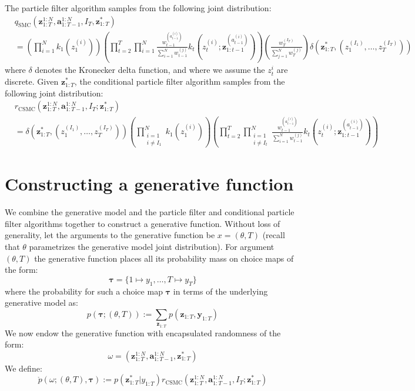 \documentclass[11pt]{article}
\newcommand{\z}{\mathbf{z}}
\newcommand{\abold}{\mathbf{a}}
\newcommand{\y}{\mathbf{y}}
\newcommand\tdict[0]{\boldsymbol{\tau}}
\begin{document}
The particle filter algorithm samples from the following joint distribution:
\begin{align*}
    & q_{\mathrm{SMC}}(\z_{1:T}^{1:N}, \abold_{1:T-1}^{1:N}, I_T, \z_{1:T}^*)\\
    &=  \left( \prod_{i=1}^N k_1(z_1^{(i)}) \right)
        \left( \prod_{t=2}^T \prod_{i=1}^N \frac{w_{t-1}^{(a_{t-1}^{(i)})}}{\sum_{i=1}^N w_{t-1}^{(j)}} k_t(z_t^{(i)}; \z_{1:t-1}^{(a_{t-1}^{(i)})} )\right)
        \left( \frac{w_T^{(I_T)}}{\sum_{j=1}^N w_T^{(j)}} \right)
        \delta(\z_{1:T}^*,  (z_1^{(I_1)}, \ldots, z_T^{(I_T)}))
\end{align*}
where $\delta$ denotes the Kronecker delta function, and where we assume the $z_{t}^i$ are discrete.
Given $\z_{1:T}^*$, the conditional particle filter algorithm samples from the following joint distribution:
\begin{align*}
    & r_{\mathrm{CSMC}}(\z_{1:T}^{1:N}, \abold_{1:T-1}^{1:N}, I_T; \z_{1:T}^*)\\
    &=  \delta(\z_{1:T}^*,  (z_1^{(I_1)}, \ldots, z_T^{(I_T)}))
        \left( \prod_{\substack{i=1\\i \ne I_1}}^N k_1(z_1^{(i)}) \right)
        \left( \prod_{t=2}^T \prod_{\substack{i=1\\i \ne I_t}}^N \frac{w_{t-1}^{(a_{t-1}^{(i)})}}{\sum_{i=1}^N w_{t-1}^{(j)}} k_t(z_t^{(i)}; \z_{1:t-1}^{(a_{t-1}^{(i)})} )\right)
\end{align*}

\section{Constructing a generative function}
We combine the generative model and the particle filter and conditional particle filter algorithms together to construct a generative function.
Without loss of generality, let the arguments to the generative function be $x = (\theta, T)$ (recall that $\theta$ parametrizes the generative model joint distribution).
For argument $(\theta, T)$ the generative function places all its probability mass on choice maps of the form:
\[
\tdict = \{1 \mapsto y_1, \ldots, T \mapsto y_T\}
\]
where the probability for such a choice map $\tdict$ in terms of the underlying generative model as:
\[
    p(\tdict; (\theta, T)) := \sum_{\z_{1:T}} p(\z_{1:T}, \y_{1:T})
\]
We now endow the generative function with encapsulated randomness of the form:
\[
\omega = (\z_{1:T}^{1:N}, \abold_{1:T-1}^{1:N}, \z_{1:T}^*)
\]
We define:
\[
\mathring{p}(\omega; (\theta, T), \tdict) := p(\z_{1:T}^* | y_{1:T}) r_{\mathrm{CSMC}}(\z_{1:T}^{1:N}, \abold_{1:T-1}^{1:N}, I_T; \z_{1:T}^*)
\]
\end{document}
